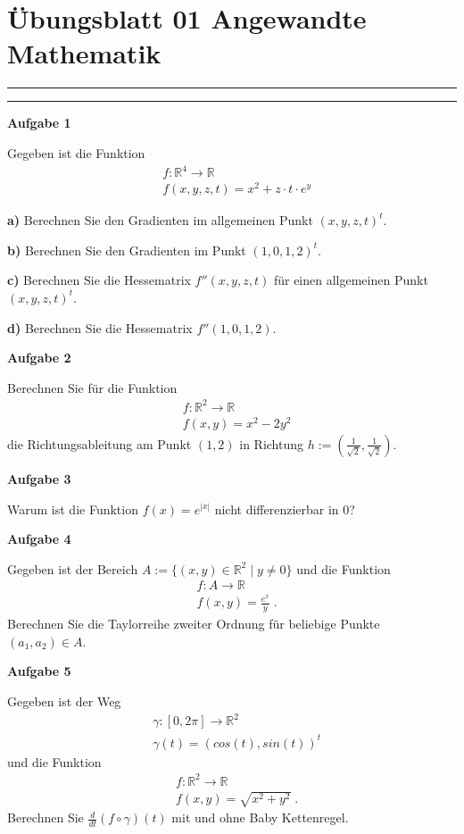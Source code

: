 \documentclass[a4paper,13pt]{scrartcl}
\begin{document}
\section*{\large  Übungsblatt 01 \hfill Angewandte Mathematik }
\hrule
\hrule
\vspace{4mm}
{\bf Aufgabe 1}

Gegeben ist die Funktion 
\begin{align*}
& f : \mathbb{R}^4 \to \mathbb{R} \\
& f(x,y,z,t) = x^2 + z\cdot t \cdot e^y 
\end{align*}

{\bf a)}  Berechnen Sie den Gradienten im allgemeinen Punkt $(x,y,z,t)^t$.

{\bf b)}  Berechnen Sie den Gradienten im  Punkt $(1,0,1,2)^t$.

{\bf c)}  Berechnen Sie die Hessematrix $f''(x,y,z,t)$ für einen allgemeinen Punkt $(x,y,z,t)^t$.

{\bf d)}  Berechnen Sie die Hessematrix $f''(1,0,1,2)$.


\vspace{8mm}
{\bf Aufgabe 2}

Berechnen Sie für die Funktion 
\begin{align*}
& f : \mathbb{R}^2 \to \mathbb{R} \\
& f(x,y) = x^2  - 2y^2 
\end{align*}
die Richtungsableitung am Punkt $(1,2)$ in Richtung $h:= (\frac{1}{\sqrt{2}}, \frac{1}{\sqrt{2}})$.

\vspace{8mm}
{\bf Aufgabe 3}

Warum ist die Funktion $f(x) = e^{|x|}$ nicht differenzierbar in $0$?


\vspace{8mm}
{\bf Aufgabe 4}

Gegeben ist der Bereich $A:= \{ (x,y) \in \mathbb{R}^2 \; | \;  y \neq 0 \}$ und die Funktion
\begin{align*}
& f : A  \to \mathbb{R} \\
& f(x,y) = \frac{e^x}{y} \;.
\end{align*}
 Berechnen Sie die Taylorreihe zweiter Ordnung für beliebige Punkte $(a_1, a_2) \in A$.

\vspace{8mm}
{\bf Aufgabe 5}

Gegeben ist der Weg 
\begin{align*}
& \gamma : [0, 2 \pi] \to \mathbb{R}^2 \\
& \gamma(t) = (cos(t), sin(t))^t
\end{align*}
und die Funktion 
\begin{align*}
& f : \mathbb{R}^2 \to\mathbb{R}  \\
& f(x,y) = \sqrt{x^2 + y^2} \;.
\end{align*}
Berechnen Sie $\frac{d}{dt} (f \circ \gamma) (t)$ mit und ohne  Baby Kettenregel.
\end{document}
